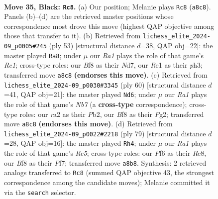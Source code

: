 \documentclass[11pt]{article}
\begin{document}
\clearpage

\begin{figure}[p]\centering
\begin{subfigure}{0.46\textwidth}\centering
\resizebox{\linewidth}{!}{%
\newchessgame
\chessboard[
  setfen={r4b2/ppN4k/5pp1/7p/P7/6P1/RPP2PKP/4r3 b - - 2 35},
  showmover=false,
  pgfstyle=straightmove, color=movearrow, markmove={a8-c8}
]}
\caption{}
\end{subfigure}\hfill
\begin{subfigure}{0.46\textwidth}\centering
\resizebox{\linewidth}{!}{%
\newchessgame
\chessboard[
  setfen={2r2k2/Nppn1pp1/7p/3P4/2P1R3/7P/P4PP1/5K2 b - - 0 27},
  showmover=false,
  pgfstyle=straightmove, color=movearrow, markmove={c8-a8}
]}
\caption{}
\end{subfigure}
\\[4pt]
\begin{subfigure}{0.46\textwidth}\centering
\resizebox{\linewidth}{!}{%
\newchessgame
\chessboard[
  setfen={3R4/1Nr2pkp/1n4p1/8/P1p5/2P4P/1P3PP1/6K1 w - - 3 31},
  showmover=false,
  pgfstyle=straightmove, color=movearrow, markmove={b7-d6}
]}
\caption{}
\end{subfigure}\hfill
\begin{subfigure}{0.46\textwidth}\centering
\resizebox{\linewidth}{!}{%
\newchessgame
\chessboard[
  setfen={4r3/2k2p1p/2p1pP2/p7/4r3/P2B4/1PP2R1P/1K6 b - - 1 40},
  showmover=false,
  pgfstyle=straightmove, color=movearrow, markmove={e4-h4}
]}
\caption{}
\end{subfigure}
\caption{\textbf{Move 35, Black: \texttt{Rc8}.} (a) Our position; Melanie plays \texttt{Rc8} (\texttt{a8c8}). Panels (b)--(d) are the retrieved master positions whose correspondence most drove this move (highest QAP objective among those that transfer to it). (b) Retrieved from \texttt{lichess\_elite\_2024-09\_p0005\#245} (ply 53) [structural distance $d$=38, QAP obj=22]: the master played \texttt{Ra8}; under $\mu$ our \emph{Ra1} plays the role of that game's \emph{Rc1}; cross-type roles: our \emph{B}f8 as their \emph{N}d7, our \emph{R}e1 as their \emph{p}h3; transferred move \texttt{a8c8} \textbf{(endorses this move)}. (c) Retrieved from \texttt{lichess\_elite\_2024-09\_p0030\#3345} (ply 60) [structural distance $d$=41, QAP obj=21]: the master played \texttt{Nd6}; under $\mu$ our \emph{Ra1} plays the role of that game's \emph{Nb7} (a \textbf{cross-type} correspondence); cross-type roles: our \emph{r}a2 as their \emph{P}b2, our \emph{B}f8 as their \emph{P}g2; transferred move \texttt{a8c8} \textbf{(endorses this move)}. (d) Retrieved from \texttt{lichess\_elite\_2024-09\_p0022\#2218} (ply 79) [structural distance $d$=28, QAP obj=16]: the master played \texttt{Rh4}; under $\mu$ our \emph{Ra1} plays the role of that game's \emph{Re5}; cross-type roles: our \emph{P}f6 as their \emph{R}e8, our \emph{B}f8 as their \emph{P}f7; transferred move \texttt{a8b8}. Synthesis: 2 retrieved analogs transferred to \texttt{Rc8} (summed QAP objective 43, the strongest correspondence among the candidate moves); Melanie committed it via the \texttt{search} selector.}
\label{fig:thought-m69}
\end{figure}
\end{document}
